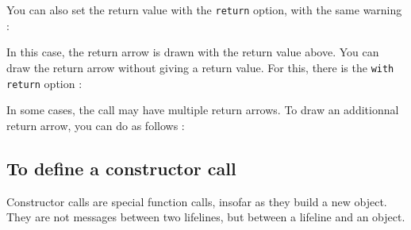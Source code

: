 \documentclass[a4paper,11pt]{report}
\newcommand{\inputTikZ}[1]{%
  }%
\newcommand{\inputTikZ}[1]{%
    \texttt{[image: fig/\#1.pdf]}%
  }%
\begin{document}
\medskip

You can also set the return value with the {\tt return} option, with the same warning :

\medskip

\begin{minipage}{0.5\textwidth}

\end{minipage}
\begin{minipage}{0.5\textwidth}
\begin{center}
\inputTikZ{callreturn}
\end{center}
\end{minipage}

\medskip

In this case, the return arrow is drawn with the return value above. You can draw the return arrow without giving a return value. For this, there is the {\tt with return} option :

\medskip

\begin{minipage}{0.5\textwidth}

\end{minipage}
\begin{minipage}{0.5\textwidth}
\begin{center}
\inputTikZ{callwithreturn}
\end{center}
\end{minipage}

\medskip

In some cases, the call may have multiple return arrows. To draw an additionnal return arrow, you can do as follows :

\medskip

\begin{minipage}{0.5\textwidth}

\end{minipage}
\begin{minipage}{0.5\textwidth}
\begin{center}
\inputTikZ{callreturnonly}
\end{center}
\end{minipage}

\subsection{To define a constructor call}\label{ss.create}

Constructor calls are special function calls, insofar as they build a new object. They are not messages between two lifelines, but between a lifeline and an object.
\end{document}
